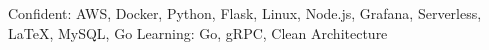 

\begin{cvskills}

  \cvskill
    {Confident:} %
    {AWS, Docker, Python, Flask, Linux, Node.js, Grafana, Serverless, LaTeX, MySQL, Go}
  \cvskill
    {Learning:} %
    {Go, gRPC, Clean Architecture}

\end{cvskills}
